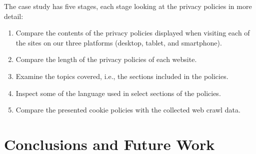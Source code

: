 \documentclass{acm_proc_article-sp}
\begin{document}
The case study has five stages, each stage looking at the privacy policies in more detail:
\begin{enumerate}
\item Compare the contents of the privacy policies displayed when visiting each of the sites on our three platforms (desktop, tablet, and smartphone).
\item Compare the length of the privacy policies of each website.
\item Examine the topics covered, i.e., the sections included in the policies.
\item Inspect some of the language used in select sections of the policies.
\item Compare the presented cookie policies with the collected web crawl data.
\end{enumerate}

\section{Conclusions and Future Work}

\nocite{*}


\end{document}
